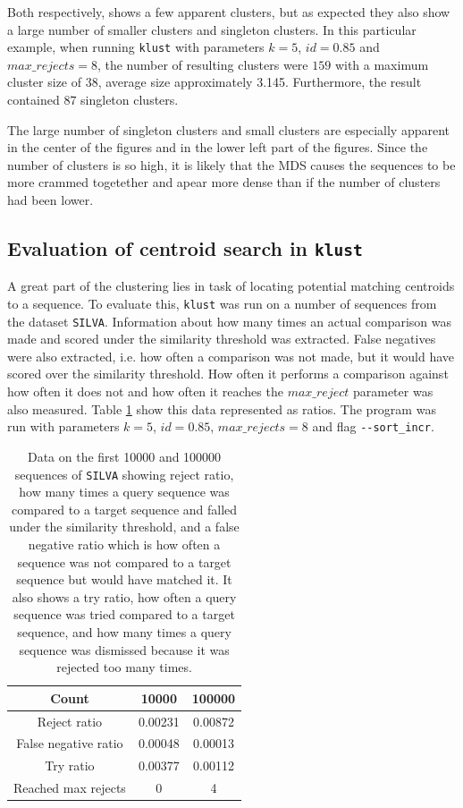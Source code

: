 Both respectively, shows a few apparent clusters, but as expected they also
show a large number of smaller clusters and singleton clusters. In this
particular example, when running \texttt{klust} with parameters $k=5$,
$id=0.85$ and $max\_rejects=8$, the number of resulting clusters were $159$ with
a maximum cluster size of $38$, average size approximately \num{3.145}.
Furthermore, the result contained $87$ singleton clusters.

The large number of singleton clusters and small clusters are especially
apparent in the center of the figures and in the lower left part of the
figures. Since the number of clusters is so high, it is likely that the MDS
causes the sequences to be more crammed togetether and apear more dense than
if the number of clusters had been lower.



\subsection{Evaluation of centroid search in \texttt{klust}}
\label{sec:evaluation_centroid_search}

A great part of the clustering lies in task of locating potential matching
centroids to a sequence. To evaluate this, \texttt{klust} was run on a number
of sequences from the dataset \texttt{SILVA}. Information about how many times
an actual comparison was made and scored under the similarity threshold was
extracted. False negatives were also extracted, i.e. how often a comparison
was not made, but it would have scored over the similarity threshold. How
often it performs a comparison against how often it does not and how often it
reaches the $max\_reject$ parameter was also measured. Table
\ref{tab:centroid_search_data} show this data represented as ratios. The
program was run with parameters $k=5$, $id=0.85$, $max\_rejects=8$ and flag
\texttt{-{}-sort\_incr}.

\begin{table}[H]
  \centering
  \begin{tabular}{c|c|c}
  Count                & \num{10000} & \num{100000} \\
  \hline\hline
  Reject ratio         & 0.00231  & 0.00872 \\
  \hline
  False negative ratio & 0.00048  & 0.00013 \\
  \hline
  Try ratio            & 0.00377  & 0.00112 \\
  \hline
  Reached max rejects  & 0           & 4 \\
  \end{tabular}
  \caption{Data on the first \num{10000} and \num{100000} sequences of
  \texttt{SILVA} showing reject ratio, how many times a query sequence was
  compared to a target sequence and falled under the similarity threshold, and
  a false negative ratio which is how often a sequence was not compared to a
  target sequence but would have matched it. It also shows a try ratio, how
  often a query sequence was tried compared to a target sequence, and how many
  times a query sequence was dismissed because it was rejected too many times.}
  \label{tab:centroid_search_data}
\end{table}

